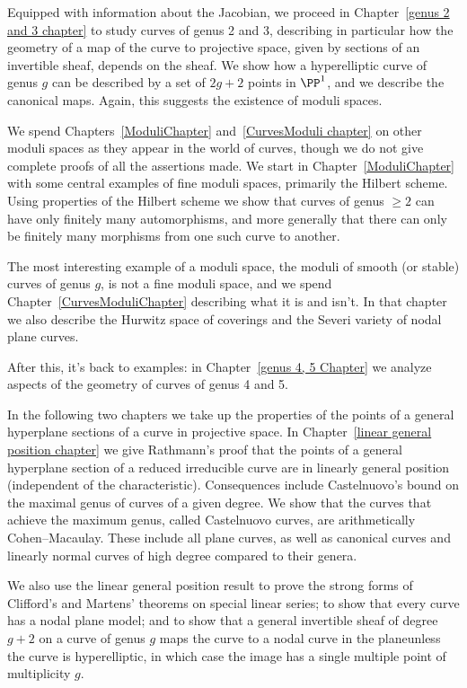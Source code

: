 Equipped with information about the Jacobian, we proceed in Chapter~\ref{genus 2 and 3 chapter} to study curves of genus 2 and 3, describing in particular how the geometry of a map of the curve to projective space,  given by sections of an invertible sheaf, depends on the sheaf. We show how a hyperelliptic curve of genus $g$
can be described by a set of $2g+2$ points in $\PP^{1}$, and we describe the canonical maps. Again, this
suggests the existence of moduli spaces.

We spend Chapters~\ref{ModuliChapter} and~\ref{CurvesModuli chapter} on other moduli spaces as they appear in the world of curves, though we do not give complete proofs of all the assertions made. We start in Chapter~\ref{ModuliChapter} with some central examples of fine moduli spaces, primarily
the Hilbert scheme. Using properties of the Hilbert scheme we show that curves of genus $\geq 2$
can have only finitely many automorphisms, and more generally that there can only be finitely
many morphisms from one such curve to another.

The most interesting example of a moduli space, the moduli of smooth (or stable) curves of genus $g$, is not a fine moduli space, and we spend Chapter~\ref{CurvesModuliChapter} describing what it is and isn't. In that chapter we also describe the Hurwitz space of coverings and the Severi variety of nodal plane curves.

After this, it's back to examples: in Chapter~\ref{genus 4, 5 Chapter} we analyze aspects of the geometry of curves of genus 4 and 5.  

In the following two chapters we take up 
the properties of the points of a general hyperplane sections of a curve in projective space. 
In Chapter~\ref{linear general position chapter} we give Rathmann's proof that
the points of a general hyperplane section of a reduced irreducible curve are in linearly general position (independent of the characteristic).
Consequences include Castelnuovo's bound  on the maximal genus of curves of a given degree.
We show that the curves that achieve the maximum genus, called Castelnuovo curves,
are arithmetically Cohen--Macaulay. These include all plane curves, as well as
canonical curves and linearly normal curves of high degree compared to their genera. 

We also
use the linear general position result to prove the strong forms of Clifford's and Martens' theorems
on special linear series; to show that every curve has a nodal plane model; and to show that a 
general invertible sheaf  of degree $g+2$ on a curve of genus $g$  maps the curve to a nodal curve
in the plane\emdash unless the curve is hyperelliptic, in which case the image has a single multiple point of
multiplicity $g$.

